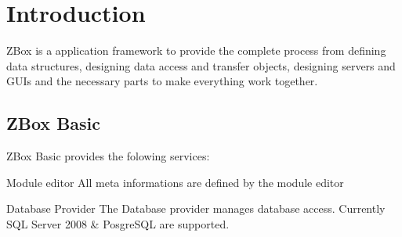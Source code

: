 \chapter{Introduction}

ZBox is a application framework to provide the complete process from
defining data structures, designing data access and transfer objects,
designing servers and GUIs and the necessary parts to make everything
work together.

\section{ZBox Basic}
ZBox Basic provides the folowing services:

\begin{descriptionBorder}
\item[Module editor] { All meta informations are defined by the module editor }
\item[Database Provider] { The Database provider manages database access.
Currently SQL Server 2008 \& PosgreSQL are supported. }
\end{descriptionBorder}
